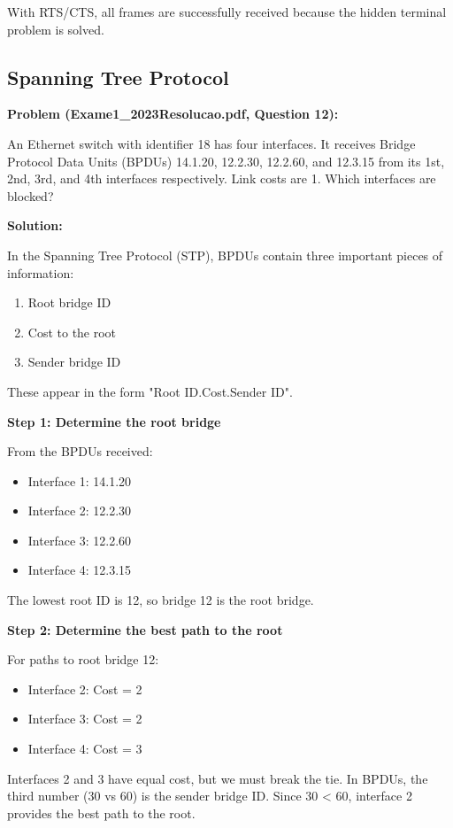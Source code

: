\documentclass[11pt,a4paper]{article}
\begin{document}
With RTS/CTS, all frames are successfully received because the hidden terminal problem is solved.

\subsection{Spanning Tree Protocol}
\textbf{Problem (Exame1\_2023Resolucao.pdf, Question 12):}

An Ethernet switch with identifier 18 has four interfaces. It receives Bridge Protocol Data Units (BPDUs) 14.1.20, 12.2.30, 12.2.60, and 12.3.15 from its 1st, 2nd, 3rd, and 4th interfaces respectively. Link costs are 1. Which interfaces are blocked?

\textbf{Solution:}

In the Spanning Tree Protocol (STP), BPDUs contain three important pieces of information:
\begin{enumerate}
    \item Root bridge ID
    \item Cost to the root
    \item Sender bridge ID
\end{enumerate}

These appear in the form "Root ID.Cost.Sender ID".

\textbf{Step 1: Determine the root bridge}

From the BPDUs received:
\begin{itemize}
    \item Interface 1: 14.1.20
    \item Interface 2: 12.2.30
    \item Interface 3: 12.2.60
    \item Interface 4: 12.3.15
\end{itemize}

The lowest root ID is 12, so bridge 12 is the root bridge.

\textbf{Step 2: Determine the best path to the root}

For paths to root bridge 12:
\begin{itemize}
    \item Interface 2: Cost = 2
    \item Interface 3: Cost = 2
    \item Interface 4: Cost = 3
\end{itemize}

Interfaces 2 and 3 have equal cost, but we must break the tie. In BPDUs, the third number (30 vs 60) is the sender bridge ID. Since 30 < 60, interface 2 provides the best path to the root.
\end{document}
